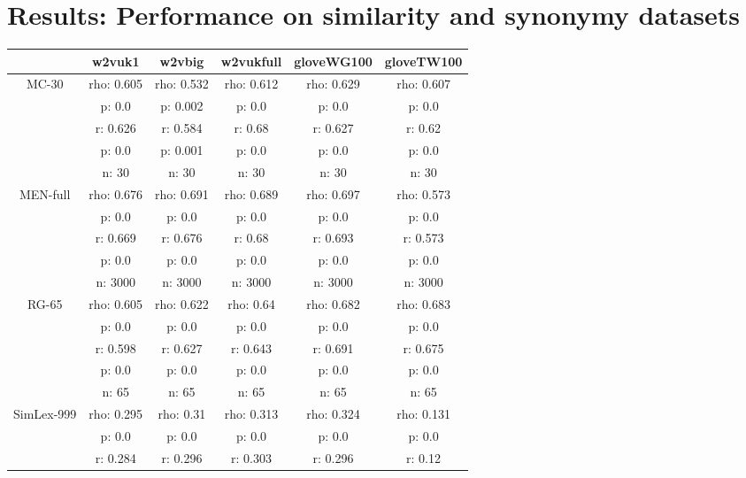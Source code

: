 \documentclass{article}
\begin{document}
\section{Results: Performance on similarity and synonymy datasets}\label{ss}
\begin{tabular}{cccccc|}\cline{2-6}
&\multicolumn{1}{|c}{w2vuk1} & w2vbig & w2vukfull & gloveWG100 & gloveTW100 \\\hline
\multicolumn{1}{|c|}{\multirow{5}{*}{MC-30}} & rho: 0.605 & rho: 0.532 & rho: 0.612 & rho: 0.629 & rho: 0.607 \\
\multicolumn{1}{|c|}{} & p: 0.0 & p: 0.002 & p: 0.0 & p: 0.0 & p: 0.0 \\
\multicolumn{1}{|c|}{} & r: 0.626 & r: 0.584 & r: 0.68 & r: 0.627 & r: 0.62 \\
\multicolumn{1}{|c|}{} & p: 0.0 & p: 0.001 & p: 0.0 & p: 0.0 & p: 0.0 \\
\multicolumn{1}{|c|}{} & n: 30 & n: 30 & n: 30 & n: 30 & n: 30 \\
\hline
\multicolumn{1}{|c|}{\multirow{5}{*}{MEN-full}} & rho: 0.676 & rho: 0.691 & rho: 0.689 & rho: 0.697 & rho: 0.573 \\
\multicolumn{1}{|c|}{} & p: 0.0 & p: 0.0 & p: 0.0 & p: 0.0 & p: 0.0 \\
\multicolumn{1}{|c|}{} & r: 0.669 & r: 0.676 & r: 0.68 & r: 0.693 & r: 0.573 \\
\multicolumn{1}{|c|}{} & p: 0.0 & p: 0.0 & p: 0.0 & p: 0.0 & p: 0.0 \\
\multicolumn{1}{|c|}{} & n: 3000 & n: 3000 & n: 3000 & n: 3000 & n: 3000 \\
\hline
\multicolumn{1}{|c|}{\multirow{5}{*}{RG-65}} & rho: 0.605 & rho: 0.622 & rho: 0.64 & rho: 0.682 & rho: 0.683 \\
\multicolumn{1}{|c|}{} & p: 0.0 & p: 0.0 & p: 0.0 & p: 0.0 & p: 0.0 \\
\multicolumn{1}{|c|}{} & r: 0.598 & r: 0.627 & r: 0.643 & r: 0.691 & r: 0.675 \\
\multicolumn{1}{|c|}{} & p: 0.0 & p: 0.0 & p: 0.0 & p: 0.0 & p: 0.0 \\
\multicolumn{1}{|c|}{} & n: 65 & n: 65 & n: 65 & n: 65 & n: 65 \\
\hline
\multicolumn{1}{|c|}{\multirow{5}{*}{SimLex-999}} & rho: 0.295 & rho: 0.31 & rho: 0.313 & rho: 0.324 & rho: 0.131 \\
\multicolumn{1}{|c|}{} & p: 0.0 & p: 0.0 & p: 0.0 & p: 0.0 & p: 0.0 \\
\multicolumn{1}{|c|}{} & r: 0.284 & r: 0.296 & r: 0.303 & r: 0.296 & r: 0.12 \\

\end{tabular}
\end{document}
